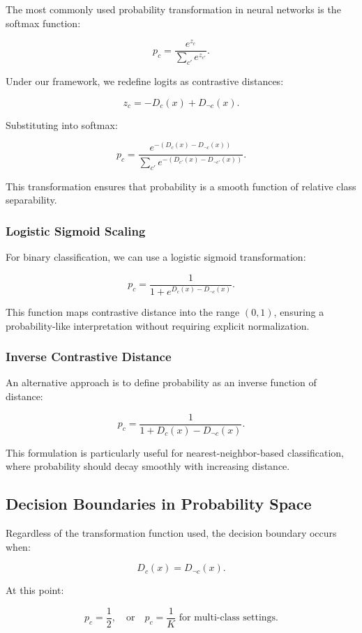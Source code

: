 The most commonly used probability transformation in neural networks is the softmax function:

\[
p_c = \frac{e^{z_c}}{\sum_{c'} e^{z_{c'}}}.
\]

Under our framework, we redefine logits as contrastive distances:

\[
z_c = -D_c(x) + D_{\neg c}(x).
\]

Substituting into softmax:

\[
p_c = \frac{e^{-(D_c(x) - D_{\neg c}(x))}}{\sum_{c'} e^{-(D_{c'}(x) - D_{\neg c'}(x))}}.
\]

This transformation ensures that probability is a smooth function of relative class separability.

\subsubsection{Logistic Sigmoid Scaling}

For binary classification, we can use a logistic sigmoid transformation:

\[
p_c = \frac{1}{1 + e^{D_c(x) - D_{\neg c}(x)}}.
\]

This function maps contrastive distance into the range \( (0,1) \), ensuring a probability-like interpretation without requiring explicit normalization.

\subsubsection{Inverse Contrastive Distance}

An alternative approach is to define probability as an inverse function of distance:

\[
p_c = \frac{1}{1 + D_c(x) - D_{\neg c}(x)}.
\]

This formulation is particularly useful for nearest-neighbor-based classification, where probability should decay smoothly with increasing distance.

\subsection{Decision Boundaries in Probability Space}

Regardless of the transformation function used, the decision boundary occurs when:

\[
D_c(x) = D_{\neg c}(x).
\]

At this point:

\[
p_c = \frac{1}{2}, \quad \text{or} \quad p_c = \frac{1}{K} \text{ for multi-class settings}.
\]

